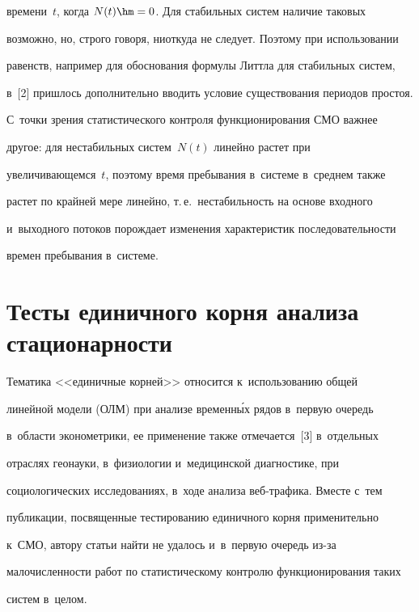 времени~$t$, когда $N(t)\hm=0$. Для стабильных сис\-тем наличие таковых 


возможно, но, строго говоря, ниоткуда не следует. Поэтому при использовании 


равенств, например для обоснования формулы Литтла для стабильных сис\-тем, 


в~[2] пришлось дополнительно вводить условие существования периодов про\-стоя.


     


     С~точки зрения статистического контроля функционирования СМО важ\-нее 


другое: для нестабильных сис\-тем~$N(t)$ линейно растет при 


уве\-ли\-чи\-ва\-ющем\-ся~$t$, поэтому время пребывания в~сис\-те\-ме в~среднем также 


растет по крайней мере линейно, т.\,е.\ не\-ста\-биль\-ность на основе входного 


и~выходного потоков по\-рож\-да\-ет изменения характеристик по\-сле\-до\-ва\-тель\-ности 


времен пребывания в~сис\-теме. 





\section{Тесты единичного корня анализа стационарности}





     Тематика <<единичные корней>> относится к~использованию общей 


линейной модели (ОЛМ) при анализе временн\'{ы}х рядов в~первую очередь  


в~об\-ласти эко\-но\-мет\-ри\-ки, ее применение также отмечается~[3] в~отдельных 


отраслях геонауки, в~физиологии и~медицинской диагностике, при 


социологических исследованиях, в~ходе анализа веб-тра\-фи\-ка. Вместе с~тем 


пуб\-ли\-ка\-ции, посвященные тестированию единичного корня применительно 


к~СМО, автору \mbox{статьи} найти не удалось и~в~первую очередь из-за 


ма\-ло\-чис\-лен\-ности работ по статистическому контролю функционирования таких 


сис\-тем в~целом. 


